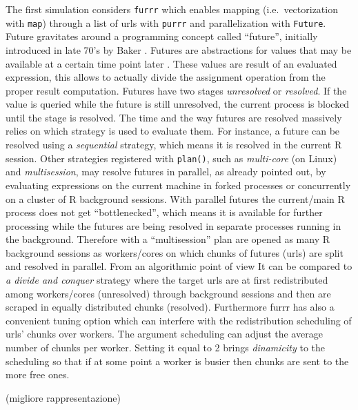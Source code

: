 \documentclass[
  12pt,
  a4paper,
  oneside]{book}
\newcommand{\passthrough}[1]{#1}
\theoremstyle{definition}
\theoremstyle{definition}
\theoremstyle{definition}
\theoremstyle{remark}
\begin{document}
The first simulation considers \passthrough{\lstinline!furrr!} which enables mapping (i.e.~vectorization with \passthrough{\lstinline!map!}) through a list of urls with \passthrough{\lstinline!purrr!} and parallelization with \passthrough{\lstinline!Future!}. Future gravitates around a programming concept called ``future'', initially introduced in late 70's by Baker \citep{BakerFuture}. Futures are abstractions for values that may be available at a certain time point later \citeyearpar{future}.
These values are result of an evaluated expression, this allows to actually divide the assignment operation from the proper result computation. Futures have two stages \emph{unresolved} or \emph{resolved}. If the value is queried while the future is still unresolved, the current process is blocked until the stage is resolved. The time and the way futures are resolved massively relies on which strategy is used to evaluate them. For instance, a future can be resolved using a \emph{sequential} strategy, which means it is resolved in the current R session. Other strategies registered with \passthrough{\lstinline!plan()!}, such as \emph{multi-core} (on Linux) and \emph{multisession}, may resolve futures in parallel, as already pointed out, by evaluating expressions on the current machine in forked processes or concurrently on a cluster of R background sessions.
With parallel futures the current/main R process does not get ``bottlenecked'', which means it is available for further processing while the futures are being resolved in separate processes running in the background. Therefore with a ``multisession'' plan are opened as many R background sessions as workers/cores on which chunks of futures (urls) are split and resolved in parallel. From an algorithmic point of view It can be compared to \emph{a divide and conquer} strategy where the target urls are at first redistributed among workers/cores (unresolved) through background sessions and then are scraped in equally distributed chunks (resolved).
Furthermore furrr has also a convenient tuning option which can interfere with the redistribution scheduling of urls' chunks over workers. The argument scheduling can adjust the average number of chunks per worker. Setting it equal to 2 brings \emph{dinamicity} \citeyearpar{furrr} to the scheduling so that if at some point a worker is busier then chunks are sent to the more free ones.

(migliore rappresentazione)
\end{document}
